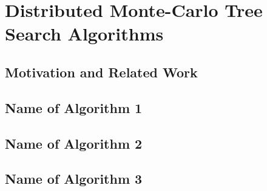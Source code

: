 \chapter{Distributed Monte-Carlo Tree Search Algorithms}

\section{Motivation and Related Work}

\section{Name of Algorithm 1}
\section{Name of Algorithm 2}
\section{Name of Algorithm 3}
